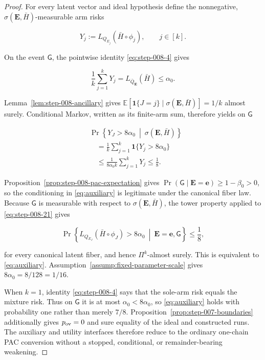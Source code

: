 \begin{proof}

For every latent vector and ideal hypothesis define the nonnegative,
\(\sigma(\mathbf E,\bar H)\)-measurable arm risks

\[
Y_j:=L_{Q_{E_j}}(\bar H\circ\phi_j),
\qquad j\in[k].
\tag{19}\label{eq:step-008-19}
\]

On the event \(\mathsf G\), the pointwise identity \eqref{eq:step-008-4} gives

\[
\frac1k\sum_{j=1}^kY_j
=L_{\bar Q_{\mathbf E}}(\bar H)
\le\alpha_0.
\tag{20}\label{eq:step-008-20}
\]

Lemma~\ref{lem:step-008-ancillary} gives
\(\mathbb E[\mathbf1\{J=j\}\mid
\sigma(\mathbf E,\bar H)]=1/k\) almost surely.  Conditional Markov,
written as its finite-arm sum, therefore yields on \(\mathsf G\)

\[
\begin{aligned}
&\Pr\!\left\{
Y_J>8\alpha_0
\ \middle|\ \sigma(\mathbf E,\bar H)
\right\}\\
&\quad=\frac1k\sum_{j=1}^k
\mathbf1\{Y_j>8\alpha_0\}\\
&\quad\le\frac1{8\alpha_0 k}\sum_{j=1}^kY_j
\le\frac18.
\end{aligned}
\tag{21}\label{eq:step-008-21}
\]

Proposition~\ref{prop:step-008-pac-expectation} gives
\(\Pr(\mathsf G\mid\mathbf E=\mathbf e)\ge1-\beta_0>0\), so the
conditioning in \eqref{eq:auxiliary} is legitimate under the canonical fiber law.
Because \(\mathsf G\) is measurable with respect to
\(\sigma(\mathbf E,\bar H)\), the tower property applied to \eqref{eq:step-008-21} gives

\[
\Pr\!\left\{
L_{Q_{E_J}}(\bar H\circ\phi_J)>8\alpha_0
\ \middle|\ \mathbf E=\mathbf e,\mathsf G
\right\}
\le\frac18,
\tag{22}\label{eq:step-008-22}
\]

for every canonical latent fiber, and hence \(\Pi^k\)-almost surely.
This is equivalent to \eqref{eq:auxiliary}.  Assumption~\ref{assump:fixed-parameter-scale}
gives \(8\alpha_0=8/128=1/16\).

When \(k=1\), identity \eqref{eq:step-008-4} says that the sole-arm risk equals the
mixture risk.  Thus on \(\mathsf G\) it is at most
\(\alpha_0<8\alpha_0\), so \eqref{eq:auxiliary} holds with probability one rather
than merely \(7/8\).  
Proposition~\ref{prop:step-007-boundaries} additionally gives
\(p_{\rm ov}=0\) and sure equality of the ideal and constructed runs.
The auxiliary and utility interfaces therefore reduce to the ordinary
one-chain PAC conversion without a stopped, conditional, or
remainder-bearing weakening.

\end{proof}

